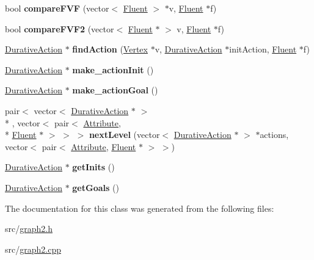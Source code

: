 \begin{DoxyCompactItemize}
\item 
\hypertarget{classGraph2_a7277b189e2ca37d0af56ed819cf6ba56}{bool {\bfseries compare\+F\+V\+F} (vector$<$ \hyperlink{classFluent}{Fluent} $>$ $\ast$v, \hyperlink{classFluent}{Fluent} $\ast$f)}\label{classGraph2_a7277b189e2ca37d0af56ed819cf6ba56}

\item 
\hypertarget{classGraph2_a3345ae3e236269ffb094cb81ec341165}{bool {\bfseries compare\+F\+V\+F2} (vector$<$ \hyperlink{classFluent}{Fluent} $\ast$ $>$ v, \hyperlink{classFluent}{Fluent} $\ast$f)}\label{classGraph2_a3345ae3e236269ffb094cb81ec341165}

\item 
\hypertarget{classGraph2_a30412993fef266024eec4d35380b3d62}{\hyperlink{classDurativeAction}{Durative\+Action} $\ast$ {\bfseries find\+Action} (\hyperlink{classVertex}{Vertex} $\ast$v, \hyperlink{classDurativeAction}{Durative\+Action} $\ast$init\+Action, \hyperlink{classFluent}{Fluent} $\ast$f)}\label{classGraph2_a30412993fef266024eec4d35380b3d62}

\item 
\hypertarget{classGraph2_ad7ad8f15df36f79fb4dff3619a8b38d2}{\hyperlink{classDurativeAction}{Durative\+Action} $\ast$ {\bfseries make\+\_\+action\+Init} ()}\label{classGraph2_ad7ad8f15df36f79fb4dff3619a8b38d2}

\item 
\hypertarget{classGraph2_ad83af08b33ce7b41253e9e7c419d29ad}{\hyperlink{classDurativeAction}{Durative\+Action} $\ast$ {\bfseries make\+\_\+action\+Goal} ()}\label{classGraph2_ad83af08b33ce7b41253e9e7c419d29ad}

\item 
\hypertarget{classGraph2_aaa2353fa2f3e9d53c06da82182d256fd}{pair$<$ vector$<$ \hyperlink{classDurativeAction}{Durative\+Action} $\ast$ $>$\\*
, vector$<$ pair$<$ \hyperlink{classAttribute}{Attribute}, \\*
\hyperlink{classFluent}{Fluent} $\ast$ $>$ $>$ $>$ {\bfseries next\+Level} (vector$<$ \hyperlink{classDurativeAction}{Durative\+Action} $\ast$ $>$ $\ast$actions, vector$<$ pair$<$ \hyperlink{classAttribute}{Attribute}, \hyperlink{classFluent}{Fluent} $\ast$ $>$ $>$)}\label{classGraph2_aaa2353fa2f3e9d53c06da82182d256fd}

\item 
\hypertarget{classGraph2_ab64b741788c25c6e810a7f9ea7a9ee41}{\hyperlink{classDurativeAction}{Durative\+Action} $\ast$ {\bfseries get\+Inits} ()}\label{classGraph2_ab64b741788c25c6e810a7f9ea7a9ee41}

\item 
\hypertarget{classGraph2_ab860c8033adb9eeb86468dae5cfa04ee}{\hyperlink{classDurativeAction}{Durative\+Action} $\ast$ {\bfseries get\+Goals} ()}\label{classGraph2_ab860c8033adb9eeb86468dae5cfa04ee}

\end{DoxyCompactItemize}


The documentation for this class was generated from the following files\+:\begin{DoxyCompactItemize}
\item 
src/\hyperlink{graph2_8h}{graph2.\+h}\item 
src/\hyperlink{graph2_8cpp}{graph2.\+cpp}\end{DoxyCompactItemize}

